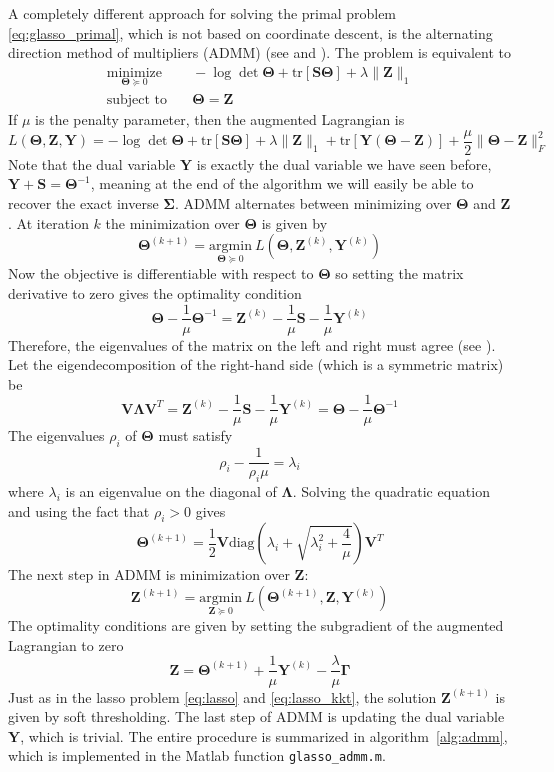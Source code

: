 \documentclass[10pt, letterpaper]{article}
\newcommand{\cov}{\boldsymbol \Sigma}
\newcommand{\preci}{\boldsymbol \Theta}
\newcommand{\tr}[1]{\mathrm{tr}\left[  #1 \right]}
\newcommand{\sampcov}{\boldsymbol S} %
\newcommand{\dualvar}{\boldsymbol Y} %
\newcommand{\bZ}{\boldsymbol Z} %
\newcommand{\bsgn}{\boldsymbol \Gamma} %
\newcommand{\diag}[1]{\mathrm{diag}\left( #1 \right)}
\begin{document}
A completely different approach for solving the primal problem \ref{eq:glasso_primal}, which is not based on coordinate descent, is the alternating direction method of multipliers (ADMM) (see \cite{ADMM} and \cite{princetonlecture}).  The problem is equivalent to
\begin{align*}
\underset{\preci \succeq 0}{\mathrm{minimize}}&\quad - \log \det \preci + \tr{\sampcov \preci} + \lambda \| \bZ\|_1\\
\text{subject to}&\quad \preci = \bZ
\end{align*}
If $\mu$ is the penalty parameter, then the augmented Lagrangian is
\[
L(\preci, \bZ, \dualvar) = - \log \det \preci + \tr{\sampcov \preci} + \lambda \| \bZ\|_1 + \tr{\dualvar\left( \preci - \bZ \right)} + \frac{\mu}{2}\|\preci - \bZ\|_{F}^2
\]
Note that the dual variable $\dualvar$ is exactly the dual variable we have seen before, $\dualvar + \sampcov = \preci^{-1}$, meaning at the end of the algorithm we will easily be able to recover the exact inverse $\cov$.  ADMM alternates between minimizing over $\preci$ and $\bZ$.  At iteration $k$ the minimization over $\preci$ is given by
\[
\preci^{(k+1)} = \underset{\preci \succeq 0}{\mathrm{argmin}}\   L(\preci, \bZ^{(k)}, \dualvar^{(k)}) 
\]
Now the objective is differentiable with respect to $\preci$ so setting the matrix derivative to zero gives the optimality condition
\[
\preci - \frac{1}{\mu}\preci^{-1} = \bZ^{(k)} - \frac{1}{\mu} \sampcov - \frac{1}{\mu}\dualvar^{(k)}
\]
Therefore, the eigenvalues of the matrix on the left and right must agree (see \cite{princetonlecture}).  Let the eigendecomposition of the right-hand side (which is a symmetric matrix) be
\[
{\boldsymbol V}{\boldsymbol \Lambda}{\boldsymbol V}^T = \bZ^{(k)} - \frac{1}{\mu} \sampcov - \frac{1}{\mu}\dualvar^{(k)} = \preci - \frac{1}{\mu}\preci^{-1}
\]
The eigenvalues $\rho_i$ of $\preci$ must satisfy
\[
\rho_i - \frac{1}{\rho_i \mu} = \lambda_i
\]
where $\lambda_i$ is an eigenvalue on the diagonal of ${\boldsymbol \Lambda}$.  Solving the quadratic equation and using the fact that $\rho_i > 0$ gives
\[
\preci^{(k+1)} = \frac{1}{2} {\boldsymbol V} \diag{ \lambda_i  + \sqrt{\lambda_i^2 + \frac{4}{\mu}} } {\boldsymbol V}^T
\]
The next step in ADMM is minimization over $\bZ$:
\[
\bZ^{(k+1)} = \underset{\bZ \succeq 0}{\mathrm{argmin}}\   L(\preci^{(k+1)}, \bZ, \dualvar^{(k)}) 
\]
The optimality conditions are given by setting the subgradient of the augmented Lagrangian to zero
\[
 \bZ =  \preci^{(k+1)} + \frac{1}{\mu} \dualvar^{(k)} - \frac{ \lambda }{\mu} \bsgn
\]
Just as in the lasso problem \ref{eq:lasso} and \ref{eq:lasso_kkt}, the solution $\bZ^{(k+1)}$ is given by soft thresholding.  The last step of ADMM is updating the dual variable $\dualvar$, which is trivial.  The entire procedure is summarized in algorithm~\ref{alg:admm}, which is implemented in the Matlab function \texttt{glasso\_admm.m}.\\
\end{document}

